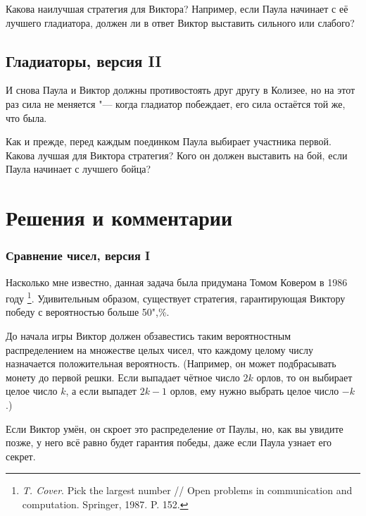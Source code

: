 \documentclass[twoside]{book}
\makeatletter
\newcommand{\rindex}[2][\imki@jobname]{%
  \index[#1]{\detokenize{#2}}%
}
\makeatother
\begin{document}
\medskip

Какова наилучшая стратегия для Виктора?
Например, если Паула начинает с её лучшего гладиатора, должен ли в ответ Виктор выставить сильного или слабого?

\pagebreak[3]

\subsection*{Гладиаторы, версия II} %
\rindex{Гладиаторы, версия II}

И снова Паула и Виктор должны противостоять друг другу в Колизее, но на этот раз сила не меняется "--- когда гладиатор побеждает, его сила остаётся той же, что была.

\medskip

Как и прежде, перед каждым поединком Паула выбирает участника первой.
Какова лучшая для Виктора стратегия? Кого он должен выставить на бой, если Паула начинает с лучшего бойца?


\section*{Решения и комментарии}

\subsubsection*{Сравнение чисел, версия I}%

Насколько мне известно, данная задача была придумана Томом Ковером %
в 1986 году%
\footnote{\emph{T. Cover}. Pick the largest number /\!/ {Open problems in communication and computation.} Springer, 1987. P. 152.}.
Удивительным образом, существует стратегия, гарантирующая Виктору победу с вероятностью больше 50",\%.

\medskip

До начала игры Виктор должен обзавестись таким вероятностным распределением на множестве целых чисел, что каждому целому числу назначается положительная вероятность.
(Например, он может подбрасывать монету до первой решки.
Если выпадает чётное число $2k$ орлов, то он выбирает целое число $k$, а если выпадет $2k-1$ орлов, ему нужно выбрать целое число $-k$.)

Если Виктор умён, он скроет это распределение от Паулы, но, как вы увидите позже, у него всё равно будет гарантия победы, даже если Паула узнает его секрет.
\end{document}
